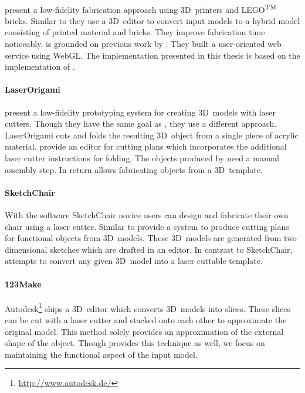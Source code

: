 \documentclass[../ClassicThesis.tex]{subfiles}
\begin{document}
\paragraph{{\brickify}} \citeauthor{bachelor-thesis} present a
low-fidelity fabrication approach using 3D~printers and
LEGO\textsuperscript{TM} bricks. Similar to {\platener} they use a
3D~editor to convert input models to a hybrid model consisting of
printed material and bricks. They improve fabrication time noticeably.
{\brickify} is grounded on previous work by \citeauthor{fabrickation}.
They built a user-oriented web service using WebGL. The implementation
presented in this thesis is based on the implementation of
{\brickify}.


\paragraph{LaserOrigami} \citeauthor{laserorigami} present a
low-fidelity prototyping system for creating 3D~models with laser
cutters. Though they have the same goal as {\platener}, they use a
different approach. LaserOrigami cuts and folds the resulting
3D~object from a single piece of acrylic material.
\citeauthor{laserorigami} provide an editor for cutting plans which
incorporates the additional laser cutter instructions for folding. The
objects produced by {\platener} need a manual assembly step. In return
{\platener} allows fabricating objects from a 3D~template.


\paragraph{SketchChair} With the software SketchChair novice users can
design and fabricate their own chair using a laser cutter. Similar to
{\platener} \citeauthor{sketchchair} provide a system to produce
cutting plans for functional objects from 3D~models. These 3D~models
are generated from two dimensional sketches which are drafted in an
editor. In contrast to SketchChair, {\platener} attempts to convert
any given 3D~model into a laser cuttable template.


\paragraph{123Make} Autodesk\footnote{\url{http://www.autodesk.de/}}
ships a 3D~editor which converts 3D~models into slices. These slices
can be cut with a laser cutter and stacked onto each other to
approximate the original model. This method solely provides an
approximation of the external shape of the object. Though {\platener}
provides this technique as well, we focus on maintaining the
functional aspect of the input model.

\end{document}
